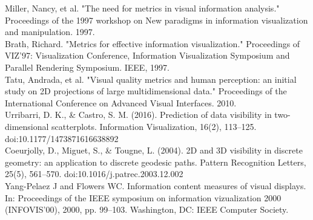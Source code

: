 \documentclass[a4paper,11pt]{article}
\begin{document}
Miller, Nancy, et al. "The need for metrics in visual information analysis." Proceedings of the 1997 workshop on New paradigms in information visualization and manipulation. 1997.\\

Brath, Richard. "Metrics for effective information visualization." Proceedings of VIZ'97: Visualization Conference, Information Visualization Symposium and Parallel Rendering Symposium. IEEE, 1997.\\

Tatu, Andrada, et al. "Visual quality metrics and human perception: an initial study on 2D projections of large multidimensional data." Proceedings of the International Conference on Advanced Visual Interfaces. 2010.\\

Urribarri, D. K., \& Castro, S. M. (2016). Prediction of data visibility in two-dimensional scatterplots. Information Visualization, 16(2), 113–125. doi:10.1177/1473871616638892\\

Coeurjolly, D., Miguet, S., \& Tougne, L. (2004). 2D and 3D visibility in discrete geometry: an application to discrete geodesic paths. Pattern Recognition Letters, 25(5), 561–570. doi:10.1016/j.patrec.2003.12.002\\

Yang-Pelaez J and Flowers WC. Information content
measures of visual displays. In: Proceedings of the IEEE symposium on information vizualization 2000 (INFOVIS’00), 2000, pp. 99–103. Washington, DC: IEEE Computer Society.

\end{document}
